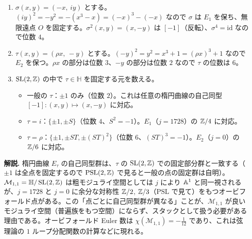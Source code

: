 \begin{enumerate}
  \item $\sigma(x,y)=(-x,\ iy)$ とする。$(iy)^2=-y^2=-(x^3-x)=(-x)^3-(-x)$ なので $\sigma$ は $E_1$ を保ち、無限遠点 $O$ を固定する。$\sigma^2(x,y)=(x,-y)$ は $[-1]$（反転）、$\sigma^4=\mathrm{id}$ なので位数 $4$。
  \item $\tau(x,y)=(\rho x,\ -y)$ とする。$(-y)^2=y^2=x^3+1=(\rho x)^3+1$ なので $E_2$ を保つ。$\rho x$ の部分は位数 $3$、$-y$ の部分は位数 $2$ なので $\tau$ の位数は $6$。
  \item $\operatorname{SL}(2,\mathbb{Z})$ の中で $\tau\in\mathbb H$ を固定する元を数える。
  \begin{itemize}
    \item 一般の $\tau$：$\pm1$ のみ（位数 $2$）。これは任意の楕円曲線の自己同型 $[-1]:(x,y)\mapsto(x,-y)$ に対応。
    \item $\tau=i$：$\{\pm1,\pm S\}$（位数 $4$、$S^2=-1$）。$E_1$（$j=1728$）の $\mathbb{Z}/4$ に対応。
    \item $\tau=\rho$：$\{\pm1,\pm ST,\pm(ST)^2\}$（位数 $6$、$(ST)^3=-1$）。$E_2$（$j=0$）の $\mathbb{Z}/6$ に対応。
  \end{itemize}
\end{enumerate}
\textbf{解説.} 楕円曲線 $E_\tau$ の自己同型群は、$\tau$ の $\operatorname{SL}(2,\mathbb{Z})$ での固定部分群と一致する（$\pm1$ は全点を固定するので $\mathrm{PSL}(2,\mathbb{Z})$ で見ると一般の点の固定群は自明）。$\mathcal M_{1,1}=\mathbb H/\operatorname{SL}(2,\mathbb{Z})$ は粗モジュライ空間としては $j$ により $\mathbb{A}^1$ と同一視されるが、$j=1728$ と $j=0$ に余分な対称性 $\mathbb{Z}/2$, $\mathbb{Z}/3$（$\mathrm{PSL}$ で見て）をもつオービフォールド点がある。この「点ごとに自己同型群が異なる」ことが、$\mathcal M_{1,1}$ が良いモジュライ空間（普遍族をもつ空間）にならず、スタックとして扱う必要がある理由である。オービフォールド Euler 数は $\chi(\mathcal M_{1,1})=-\tfrac1{12}$ であり、これは弦理論の $1$ ループ分配関数の計算などに現れる。

